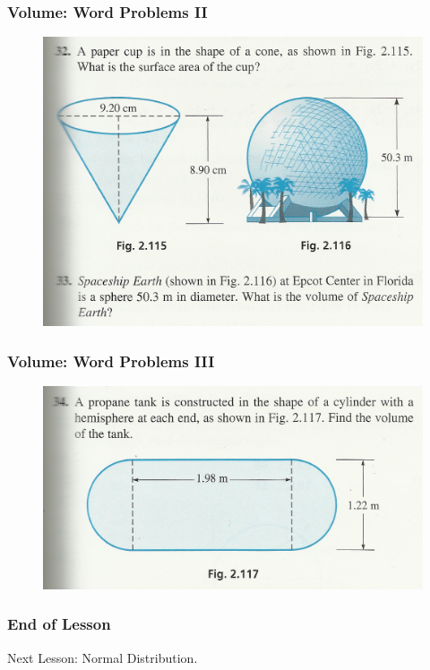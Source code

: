 \documentclass[xcolor=dvipsnames]{beamer}
\begin{document}
\begin{frame}
  \frametitle{Volume: Word Problems II}
  \begin{figure}[h]
    \includegraphics[scale=1]{./volume2.png}
  \end{figure}
\end{frame}

\begin{frame}
  \frametitle{Volume: Word Problems III}
  \begin{figure}[h]
    \includegraphics[scale=1]{./volume3.png}
  \end{figure}
\end{frame}

\begin{frame}
  \frametitle{End of Lesson}
Next Lesson: Normal Distribution.
\end{frame}
\end{document}
